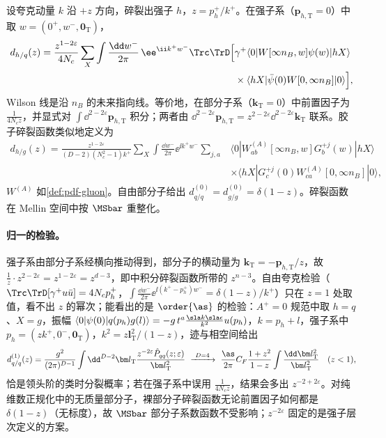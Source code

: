 \begin{definition}[碎裂函数]\label{def:pdf-ff}
设夸克动量 $k$ 沿 $+z$ 方向，碎裂出强子 $h$，$z=p_h^+/k^+$。在强子系（$\bm p_{h,\mathrm T}=0$）中取 $w=(0^+,w^-,\bm 0_{\mathrm T})$，
\begin{equation}\label{eq:pdf-ff}
\begin{aligned}
d_{h/q}(z)=\frac{z^{1-2\varepsilon}}{4N_c}\sum_X\int\frac{\dd w^-}{2\pi}\,\ee^{\ii k^+w^-}\Trc\TrD\Big[&\gamma^+\langle0|W[\infty n_B,w]\psi(w)|hX\rangle\\
&\times\langle hX|\bar\psi(0)W[0,\infty n_B]|0\rangle\Big],
\end{aligned}
\end{equation}
Wilson 线是沿 $n_B$ 的未来指向线。等价地，在部分子系（$\bm k_{\mathrm T}=0$）中前置因子为 $\frac1{4N_cz}$，并显式对 $\int\dd^{2-2\varepsilon}\bm p_{h,\mathrm T}$ 积分；两者由 $\dd^{2-2\varepsilon}\bm p_{h,\mathrm T}=z^{2-2\varepsilon}\dd^{2-2\varepsilon}\bm k_{\mathrm T}$ 联系。胶子碎裂函数类似地定义为
\begin{equation}\label{eq:pdf-ffg}
\begin{aligned}
d_{h/g}(z)=\frac{z^{1-2\varepsilon}}{(D-2)(N_c^2-1)k^+}\sum_X\int\frac{\dd w^-}{2\pi}\ee^{\ii k^+w^-}\sum_{j,a}&\langle0|W^{(A)}_{ab}[\infty n_B,w]G^{+j}_b(w)|hX\rangle\\
&\times\langle hX|G^{+j}_c(0)W^{(A)}_{ca}[0,\infty n_B]|0\rangle,
\end{aligned}
\end{equation}
$W^{(A)}$ 如\cref{def:pdf-gluon}。自由部分子给出 $d^{(0)}_{q/q}=d^{(0)}_{g/g}=\delta(1-z)$。碎裂函数在 Mellin 空间中按 $\MSbar$ 重整化。
\end{definition}

\paragraph{归一的检验。}
强子系由部分子系经横向推动得到，部分子的横动量为 $\bm k_{\mathrm T}=-\bm p_{h,\mathrm T}/z$，故 $\frac1z\cdot z^{2-2\varepsilon}=z^{1-2\varepsilon}=z^{d-3}$，即\cite[第~12.4~节，式~(12.38)、(12.40)]{Collins2011}中积分碎裂函数所带的 $z^{n-3}$。自由夸克检验（$\Trc\TrD[\gamma^+u\bar u]=4N_cp_h^+$，$\int\frac{\dd w^-}{2\pi}\ee^{\ii(k^+-p_h^+)w^-}=\delta(1-z)/k^+$）只在 $z=1$ 处取值，看不出 $z$ 的幂次；能看出的是 $\order{\as}$ 的检验：$A^+=0$ 规范中取 $h=q$、$X=g$，振幅 $\langle0|\psi(0)|q(p_h)g(l)\rangle=-g\,t^a\frac{\sla k\sla\epsilon}{k^2}u(p_h)$，$k=p_h+l$，强子系中 $p_h=(zk^+,0^-,\bm 0_{\mathrm T})$，$k^2=z\bm l_{\mathrm T}^2/(1-z)$，迹与相空间给出
\[
d^{(1)}_{q/q}(z)=\frac{g^2}{(2\pi)^{D-1}}\int\dd^{D-2}\bm l_{\mathrm T}\frac{z^{-2\varepsilon}\hat P_{qq}(z;\varepsilon)}{\bm l_{\mathrm T}^2}\ \xrightarrow{\ D=4\ }\ \frac{\as}{2\pi}C_F\frac{1+z^2}{1-z}\int\frac{\dd\bm l_{\mathrm T}^2}{\bm l_{\mathrm T}^2}\quad(z<1),
\]
恰是领头阶的类时分裂概率；若在强子系中误用 $\frac1{4N_cz}$，结果会多出 $z^{-2+2\varepsilon}$。对纯维数正规化中的无质量部分子，裸部分子碎裂函数无论前置因子如何都是 $\delta(1-z)$（无标度），故 $\MSbar$ 部分子系数函数不受影响；$z^{-2\varepsilon}$ 固定的是强子层次定义的方案。

